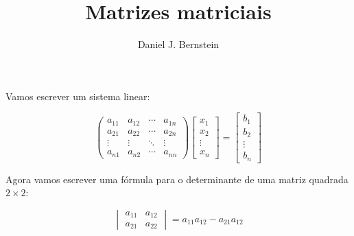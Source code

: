 \documentclass[12pt, a4paper]{article}
\title{Matrizes matriciais}
\author{Daniel J. Bernstein}
\date{}
\begin{document}
  \maketitle

  Vamos escrever um sistema linear:

  \[
    \begin{pmatrix}
      a_{11} & a_{12} & \cdots & a_{1n}\\
      a_{21} & a_{22} & \cdots & a_{2n}\\
      \vdots & \vdots & \ddots & \vdots\\
      a_{n1} & a_{n2} & \cdots & a_{nn}
    \end{pmatrix}
    \begin{bmatrix}
      x_1\\ x_2 \\ \vdots\\ x_n
    \end{bmatrix}
    =
    \begin{bmatrix}
      b_1 \\ b_2 \\ \vdots \\ b_n
    \end{bmatrix}
  \]

  Agora vamos escrever uma fórmula para o determinante de uma matriz quadrada $2 \times 2$:

  \begin{equation}
    \begin{vmatrix}
      a_{11} & a_{12} \\
      a_{21} & a_{22}
    \end{vmatrix}
    =
    a_{11}a_{12} - a_{21}a_{12}
  \end{equation}
\end{document}
